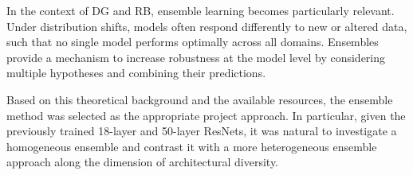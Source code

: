 In the context of DG and RB, ensemble learning becomes particularly relevant. 
Under distribution shifts, models often respond differently to new or altered data, such that no single model performs optimally across all domains. 
Ensembles provide a mechanism to increase robustness at the model level by considering multiple hypotheses and combining their predictions.

Based on this theoretical background and the available resources, the ensemble method was selected as the appropriate project approach. In particular, given the previously trained 18-layer and 50-layer ResNets, it was natural to investigate a homogeneous ensemble and contrast it with a more heterogeneous ensemble approach along the dimension of architectural diversity.
